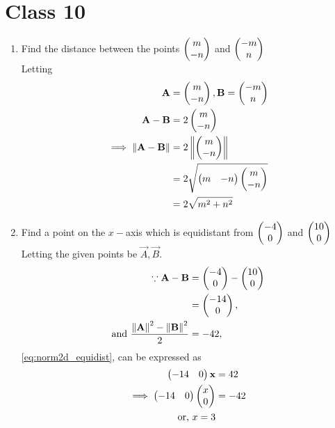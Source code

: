\documentclass[journal,12pt,twocolumn]{IEEEtran}
\renewcommand\thesection{\arabic{section}}
\begin{document}
\section{Class 10}
\renewcommand{\theequation}{\theenumi}
\begin{enumerate}[label=\thesection.\arabic*.,ref=\thesection.\theenumi]
\item  Find the distance between the points $\begin{pmatrix}m \\ -n\end{pmatrix}$ and $\begin{pmatrix}-m \\ n\end{pmatrix}$
	\\
		\solution Letting 
		\begin{align}
			\mathbf{A} &= \begin{pmatrix}m \\ -n\end{pmatrix}, \mathbf{B}=\begin{pmatrix}-m \\ n\end{pmatrix}
			\\
			\mathbf{A}-\mathbf{B} &= 2\begin{pmatrix}m \\ -n\end{pmatrix}
			\\
			\implies \left\lVert\mathbf{A}-\mathbf{B}\right\rVert &=2\left\lVert\begin{pmatrix}m \\ -n\end{pmatrix}\right\rVert
			\\
			&=2 \sqrt{\begin{pmatrix}m & -n\end{pmatrix}\begin{pmatrix}m \\ -n\end{pmatrix}} 
\\
			&			= 2 \sqrt{m^2+n^2}
		\end{align}
	\item Find a point on the $x-$axis which is equidistant from $\begin{pmatrix} -4 \\ 0\end{pmatrix}$ and $\begin{pmatrix}10 \\ 0\end{pmatrix}$
\\
\solution Letting the given points be $\vec{A},\vec{B}$. 
		\begin{align}
	\because  \mathbf{A}-\mathbf{B} &= \begin{pmatrix} -4 \\ 0\end{pmatrix}-\begin{pmatrix}10 \\ 0\end{pmatrix}
	  \\
	  &= \begin{pmatrix} -14 \\ 0\end{pmatrix},
	  \\
			\text{and }	   \frac{\left\lVert\mathbf{A}\right\rVert^2 - \left\lVert\mathbf{B}\right\rVert^2}{2} &= -42,
  \end{align}
  \eqref{eq:norm2d_equidist}, can be expressed as 
  \begin{align}
	  \myvec{ -14 & 0}\vec{x} 
	  &=  42
	  \\
	  \implies 
	  \myvec{ -14 & 0}\myvec{x \\ 0} 
	  &=  -42
	  \\
	  \text{or, } x =3 

\end{align}
\end{enumerate}
\end{document}
